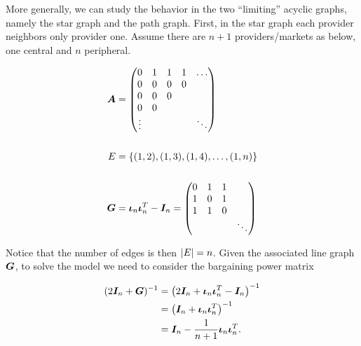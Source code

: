 More generally, we can study the behavior in the two ``limiting'' acyclic graphs, namely the star graph and the path graph. First, in the star graph each provider neighbors only provider one. Assume there are $n + 1$ providers/markets as below, one central and $n$ peripheral.

\vspace{5mm}
\begin{minipage}{.5\textwidth}
  \resizebox{\textwidth}{!}{}
\end{minipage}
\begin{minipage}{.5\textwidth}
  \begin{equation*}
    \begin{split}
      \matr{A} &= \begin{pmatrix}
        0      & 1 & 1 & 1 & \ldots \\
        0      & 0 & 0 & 0 &        \\
        0      & 0 & 0 &   &        \\
        0      & 0 &   &   &        \\
        \vdots &   &   &   & \ddots
      \end{pmatrix} \\
      \vspace{5mm} \\
      E &= \set{(1, 2), (1, 3), (1, 4), \ldots, (1, n)} \\
      \vspace{5mm} \\
      \G &= \matr{\iota}_n \matr{\iota}_n^T - \I_n =  \begin{pmatrix}
        0 & 1 & 1 &        \\
        1 & 0 & 1 &        \\
        1 & 1 & 0 &        \\
          &   &   & \ddots
      \end{pmatrix}
    \end{split}
  \end{equation*}
\end{minipage}
\vspace{5mm}

Notice that the number of edges is then $\lvert E\rvert = n$. Given the associated line graph $\bm{G}$, to solve the model we need to consider the bargaining power matrix

\begin{equation*}
  \begin{split}
    (2\bm{I}_n + \bm{G})^{-1} &= \left( 2\bm{I}_n + \bm{\iota}_n \bm{\iota}_n^T - \bm{I}_n \right)^{-1}\\
    &= \left( \bm{I}_n + \bm{\iota}_n \bm{\iota}_n^T \right)^{-1} \\
    &= \bm{I}_n - \frac{1}{n + 1} \bm{\iota}_n \bm{\iota}_n^T.
  \end{split}
\end{equation*}

